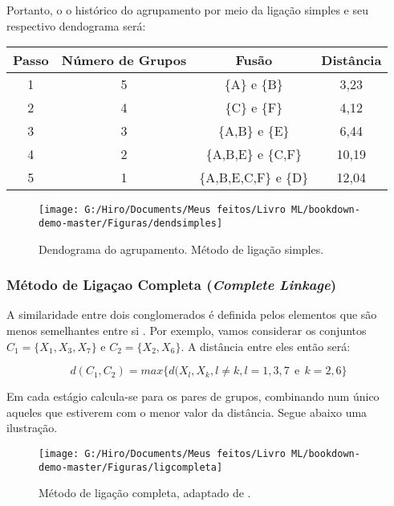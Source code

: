 \documentclass[
]{book}
\begin{document}
Portanto, o o histórico do agrupamento por meio da ligação simples e seu respectivo dendograma será:

\begin{longtable}[]{@{}cccc@{}}
\toprule
\textbf{Passo} & \textbf{Número de Grupos} & \textbf{Fusão} & \textbf{Distância}\tabularnewline
\midrule
\endhead
1 & 5 & \{A\} e \{B\} & 3,23\tabularnewline
2 & 4 & \{C\} e \{F\} & 4,12\tabularnewline
3 & 3 & \{A,B\} e \{E\} & 6,44\tabularnewline
4 & 2 & \{A,B,E\} e \{C,F\} & 10,19\tabularnewline
5 & 1 & \{A,B,E,C,F\} e \{D\} & 12,04\tabularnewline
\bottomrule
\end{longtable}

\begin{figure}

{\centering \texttt{[image: G:/Hiro/Documents/Meus feitos/Livro ML/bookdown-demo-master/Figuras/dendsimples]} 

}

\caption{Dendograma do agrupamento. Método de ligação simples.}\label{fig:dendsimples}
\end{figure}



\hypertarget{muxe9todo-de-ligauxe7ao-completa-complete-linkage}{%
\subsubsection{\texorpdfstring{Método de Ligaçao Completa (\emph{Complete Linkage})}{Método de Ligaçao Completa (Complete Linkage)}}\label{muxe9todo-de-ligauxe7ao-completa-complete-linkage}}

A similaridade entre dois conglomerados é definida pelos elementos que são menos semelhantes entre si \citep{sneath1957application}. Por exemplo, vamos considerar os conjuntos \(C_1=\{X_1,X_3,X_7\}\) e \(C_2=\{X_2,X_6\}\). A distância entre eles então será:

\begin{equation}
d(C_1,C_2)=max \{d(X_l,X_k, l\neq k,l=1,3,7 \ \ \mbox{e} \ \ k=2,6\}
 \label{eq:ligcompleta}
\end{equation}

Em cada estágio calcula-se para os pares de grupos, combinando num único aqueles que estiverem com o menor valor da distância. Segue abaixo uma ilustração.

\begin{figure}

{\centering \texttt{[image: G:/Hiro/Documents/Meus feitos/Livro ML/bookdown-demo-master/Figuras/ligcompleta]} 

}

\caption{Método de ligação completa, adaptado de \citet{mingoti2007analise}.}\label{fig:ligcompleta}
\end{figure}
\end{document}
